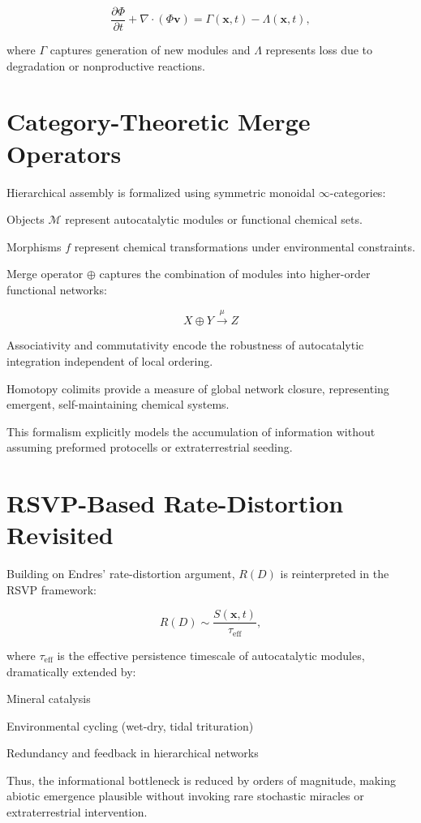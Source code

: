 \documentclass{book}
\begin{document}
\[\frac{\partial \Phi}{\partial t} + \nabla \cdot (\Phi \mathbf{v}) = \Gamma(\mathbf{x}, t) - \Lambda(\mathbf{x}, t),\]

where $\Gamma$ captures generation of new modules and $\Lambda$ represents loss due to degradation or nonproductive reactions.

\section{Category-Theoretic Merge Operators}
Hierarchical assembly is formalized using symmetric monoidal $\infty$-categories:

Objects $\mathcal{M}$ represent autocatalytic modules or functional chemical sets.

Morphisms $f$ represent chemical transformations under environmental constraints.

Merge operator $\oplus$ captures the combination of modules into higher-order functional networks:

\[X \oplus Y \xrightarrow{\mu} Z\]

Associativity and commutativity encode the robustness of autocatalytic integration independent of local ordering.

Homotopy colimits provide a measure of global network closure, representing emergent, self-maintaining chemical systems.

This formalism explicitly models the accumulation of information without assuming preformed protocells or extraterrestrial seeding.

\section{RSVP-Based Rate-Distortion Revisited}
Building on Endres’ rate-distortion argument, $R(D)$ is reinterpreted in the RSVP framework:

\[R(D) \sim \frac{S(\mathbf{x}, t)}{\tau_{\mathrm{eff}}},\]

where $\tau_{\mathrm{eff}}$ is the effective persistence timescale of autocatalytic modules, dramatically extended by:

Mineral catalysis \citep{hazen2005}

Environmental cycling (wet-dry, tidal trituration)

Redundancy and feedback in hierarchical networks

Thus, the informational bottleneck is reduced by orders of magnitude, making abiotic emergence plausible without invoking rare stochastic miracles or extraterrestrial intervention.
\end{document}

